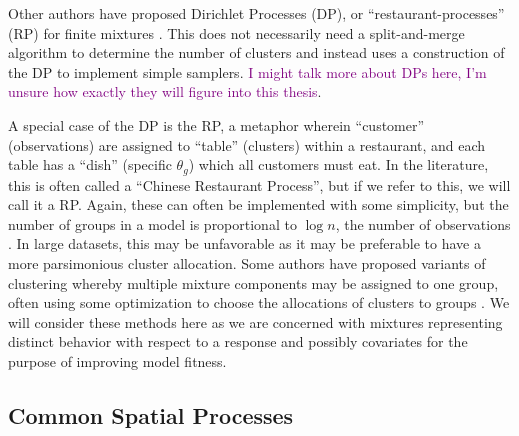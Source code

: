 \documentclass[twoside,12pt,bibstyle=chem-acs]{reedthesis}
\begin{document}
Other authors have proposed Dirichlet Processes (DP), or ``restaurant-processes'' (RP) for finite mixtures \cite{gelman_bayesian_2014, rodriguez_nested_2008, wehrhahn_bayesian_2020}. This does not necessarily need a split-and-merge algorithm to determine the number of clusters and instead uses a construction of the DP to implement simple samplers. \textcolor{purple}{I might talk more about DPs here, I'm unsure how exactly they will figure into this thesis}. 

A special case of the DP is the RP, a metaphor wherein ``customer'' (observations) are assigned to ``table'' (clusters) within a restaurant, and each table has a ``dish'' (specific $\theta_g$) which all customers must eat. In the literature, this is often called a ``Chinese Restaurant Process'', but if we refer to this, we will call it a RP. Again, these can often be implemented with some simplicity, but the number of groups in a model is proportional to $\log n$, the number of observations \cite{gelman_bayesian_2014}. In large datasets, this may be unfavorable as it may be preferable to have a more parsimonious cluster allocation. Some authors have proposed variants of clustering whereby multiple mixture components may be assigned to one group, often using some optimization to choose the allocations of clusters to groups \cite{ng_model-based_2021, baudry_combining_2010}. We will consider these methods here as we are concerned with mixtures representing distinct behavior with respect to a response and possibly covariates for the purpose of improving model fitness.

\subsection{Common Spatial Processes}
\label{sbsc: spatiotemporal intro}
\end{document}

